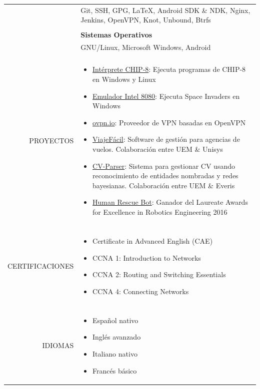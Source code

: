 \documentclass[a4paper, 11pt]{article}
\begin{document}
\begin{longtable}{rp{11cm}}
    & Git, SSH, GPG, \LaTeX, Android SDK \& NDK, Nginx, Jenkins, OpenVPN, Knot, Unbound, Btrfs\\
    \\
    & {\bf Sistemas Operativos}\\
    & GNU/Linux, Microsoft Windows, Android\\
    \\
    PROYECTOS
    & \vspace{-8mm}
    \begin{itemize}[leftmargin=0cm,label={}]
        \item \href{https://github.com/hugo19941994/CHIP8-Emu}{Intérprete CHIP-8}: Ejecuta programas de CHIP-8 en Windows y Linux
        \item \href{https://github.com/hugo19941994/SpaceInvaders-Emu}{Emulador Intel 8080}: Ejecuta Space Invaders en Windows
        \item \href{https://ovpn.io}{ovpn.io}: Proveedor de VPN basadas en OpenVPN
        \item \href{https://github.com/hugo19941994/ViajeFacil}{ViajeFácil}: Software de gestión para agencias de vuelos. Colaboración entre UEM \& Unisys
        \item \href{https://github.com/hugo19941994/CV-Parser}{CV-Parser}: Sistema para gestionar CV usando reconocimiento de entidades nombradas y redes bayesianas. Colaboración entre UEM \& Everis
        \item \href{https://github.com/hugo19941994/robot}{Human Rescue Bot}: Ganador del Laureate Awards for Excellence in Robotics Engineering 2016
    \end{itemize}\\
    \\
    CERTIFICACIONES
    & \vspace{-8mm}
    \begin{itemize}[leftmargin=0cm,label={},noitemsep]
        \item Certificate in Advanced English (CAE)
        \item CCNA 1: Introduction to Networks
        \item CCNA 2: Routing and Switching Essentials
        \item CCNA 4: Connecting Networks
    \end{itemize}\\
    \\
    IDIOMAS
    & \vspace{-8mm}
    \begin{itemize}[leftmargin=0cm,label={},noitemsep]
        \item Español nativo
        \item Inglés avanzado
        \item Italiano nativo
        \item Francés básico
    \end{itemize}
\end{longtable}
\end{document}
